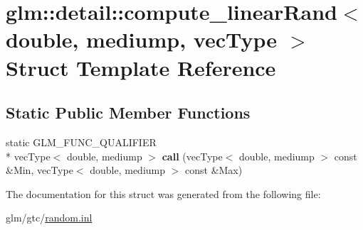 \hypertarget{structglm_1_1detail_1_1compute__linearRand_3_01double_00_01mediump_00_01vecType_01_4}{\section{glm\-:\-:detail\-:\-:compute\-\_\-linear\-Rand$<$ double, mediump, vec\-Type $>$ Struct Template Reference}
\label{structglm_1_1detail_1_1compute__linearRand_3_01double_00_01mediump_00_01vecType_01_4}
}
\subsection*{Static Public Member Functions}
\begin{DoxyCompactItemize}
\item 
\hypertarget{structglm_1_1detail_1_1compute__linearRand_3_01double_00_01mediump_00_01vecType_01_4_a031b3fa7e6d9050f4d038c13239a71a7}{static G\-L\-M\-\_\-\-F\-U\-N\-C\-\_\-\-Q\-U\-A\-L\-I\-F\-I\-E\-R \\*
vec\-Type$<$ double, mediump $>$ {\bfseries call} (vec\-Type$<$ double, mediump $>$ const \&Min, vec\-Type$<$ double, mediump $>$ const \&Max)}\label{structglm_1_1detail_1_1compute__linearRand_3_01double_00_01mediump_00_01vecType_01_4_a031b3fa7e6d9050f4d038c13239a71a7}

\end{DoxyCompactItemize}


The documentation for this struct was generated from the following file\-:\begin{DoxyCompactItemize}
\item 
glm/gtc/\hyperlink{random_8inl}{random.\-inl}\end{DoxyCompactItemize}
